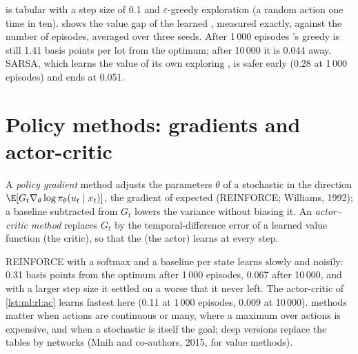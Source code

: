  is tabular  with a step size of 0.1 and $\varepsilon$-greedy exploration (a random action
one time in ten).  shows the value gap of the learned , measured exactly, against the number of
episodes, averaged over three seeds. After 1\,000 episodes 's greedy  is still 1.41 basis points per lot from
the optimum; after 10\,000 it is 0.044 away. SARSA, which learns the value of its own exploring , is safer early
(0.28 at 1\,000 episodes) and ends at 0.051.

\section{Policy methods: gradients and actor-critic}

\begin{definition}\label{def:ml:reinforcement-learning-foundations:pg}
A \emph{policy gradient} method adjusts the parameters $\theta$ of a stochastic  in the direction
$\E[G_t\nabla_\theta\log\pi_\theta(u_t\mid x_t)]$, the gradient of expected  (REINFORCE; Williams, 1992); a
baseline subtracted from $G_t$ lowers the variance without biasing it. An \emph{actor--critic method} replaces $G_t$ by the temporal-difference error of a learned value function (the critic), so that the  (the
actor) learns at every step.
\end{definition}

REINFORCE with a softmax  and a baseline per state learns slowly and noisily: 0.31 basis points from the optimum after
1\,000 episodes, 0.067 after 10\,000, and with a larger step size it settled on a worse  that it never left. The
actor-critic of \cref{lst:ml:rl:ac} learns fastest here (0.11 at 1\,000 episodes, 0.009 at 10\,000).  methods matter
when actions are continuous or many, where a maximum over actions is expensive, and when a stochastic  is itself the
goal; deep versions replace the tables by networks (Mnih and co-authors, 2015, for value methods).

